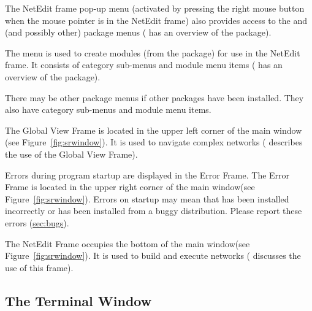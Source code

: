 \begin{description}
\begin{description}
    The NetEdit frame pop-up menu (activated by pressing the right
    mouse button when the mouse pointer is in the NetEdit frame) also
    provides access to the \menu{\sr{}} and \menu{\biopse{}} (and
    possibly other) package menus ( has an overview of the
    \sr{} package).
  \end{description}

  \begin{description}
     The  menu is used to create modules
    (from the \biopse  package) for use in the NetEdit frame.  It
    consists of category sub-menus and module menu items 
    ( has an overview of the \biopse{}package).
  \end{description}

  \begin{description}
     There may be other
    package menus if other packages have been installed.  They also
    have category sub-menus and module menu items.
  \end{description}
  
   The Global View Frame is located in the
  upper left corner of the main window (see
  Figure~\ref{fig:srwindow}). It is used to navigate complex networks
  ( describes the use of the Global View Frame).
  
   Errors during program startup are displayed
  in the Error Frame.  The Error Frame is located in the upper right corner of the
  main window(see Figure~\ref{fig:srwindow}).  Errors on startup may
  mean that \sr{} has been installed incorrectly or has been installed
  from a buggy distribution.  Please report these errors (\hyperref{report}{see
    Section~}{)}{sec:bugs}).
  
   The NetEdit Frame occupies the bottom of
  the main window(see Figure~\ref{fig:srwindow}).  It is used to build
  and execute networks (
  discusses the use of this frame).

\end{description}

\subsection{The Terminal Window}
\label{sec:termwinapp}


